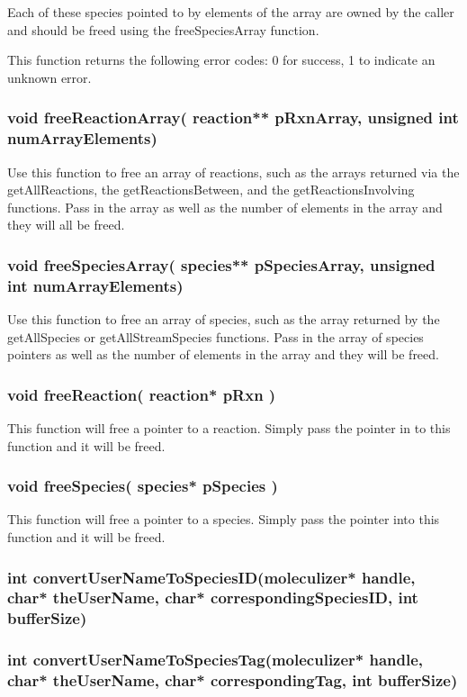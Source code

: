 Each of these species pointed to by elements of the array are owned by
the caller and should be freed using the freeSpeciesArray function.

This function returns the following error codes: 0 for success, 1 to
indicate an unknown error.  

\subsubsection{void freeReactionArray( reaction** pRxnArray, unsigned
  int numArrayElements)}

Use this function to free an array of reactions, such as the arrays
returned via the getAllReactions, the getReactionsBetween, and the
getReactionsInvolving functions.  Pass in the array as well as the
number of elements in the array and they will all be freed.

\subsubsection{void freeSpeciesArray( species** pSpeciesArray,
  unsigned int numArrayElements)}

Use this function to free an array of species, such as the array
returned by the getAllSpecies or getAllStreamSpecies functions.  Pass
in the array of species pointers as well as the number of elements in
the array and they will be freed.


\subsubsection{void freeReaction( reaction* pRxn )}
This function will free a pointer to a reaction.  Simply pass the
pointer in to this function and it will be freed.

\subsubsection{void freeSpecies( species* pSpecies )}
This function will free a pointer to a species.  Simply pass the
pointer into this function and it will be freed.

\subsubsection{int convertUserNameToSpeciesID(moleculizer* handle,
  char* theUserName, char* correspondingSpeciesID, int bufferSize)}


\subsubsection{int convertUserNameToSpeciesTag(moleculizer* handle,
  char* theUserName, char* correspondingTag, int bufferSize)}


